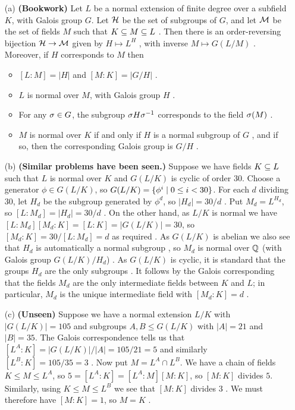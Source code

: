 \documentclass[a4paper]{article}
\begin{document}
\begin{solution}
  \begin{itemize}
  \item[(a)] \textbf{(Bookwork)}
   Let $L$ be a normal extension \mk of finite degree over a
   subfield $K$, with Galois group $G$.  Let $\mathcal{H}$ be the set of
   subgroups of $G$, and let $\mathcal{M}$ be the set of fields $M$ such that
   $K\subseteq M\subseteq L$ \mk.  Then there is an order-reversing \mk bijection
   $\mathcal{H}\to\mathcal{M}$ given by $H\mapsto L^H$ \mk, with inverse
   $M\mapsto G(L/M)$ \mk.  Moreover, if $H$ corresponds to $M$ then
   \begin{itemize}
    \item $[L:M]=|H|$ \mk and $[M:K]=|G/H|$ \mk.
    \item $L$ is normal over $M$, with Galois group $H$ \mk.
    \item For any $\sigma\in G$, the subgroup $\sigma H\sigma^{-1}$ corresponds
     to the field $\sigma(M)$ \mk.
    \item $M$ is normal over $K$ if and only if $H$ is a normal
     subgroup of $G$ \mk, and if so, then the corresponding Galois group
     is $G/H$ \mk.
   \end{itemize}
  \item[(b)] \textbf{(Similar problems have been seen.)}
   Suppose we have fields $K\subseteq L$ such that $L$ is normal
   over $K$ and $G(L/K)$ is cyclic of order $30$.  Choose a generator
   $\phi\in G(L/K)$, so $G(L/K)=\{\phi^i\;|\; 0\leq i<30\}$.  For each
   $d$ dividing $30$, let $H_d$ be the subgroup generated by $\phi^d$,
   so $|H_d|=30/d$ .  Put $M_d=L^{H_d}$, so
   $[L:M_d]=|H_d|=30/d$ \mk.  On the other hand, as $L/K$ is normal we
   have $[L:M_d][M_d:K]=[L:K]=|G(L/K)|=30$, so $[M_d:K]=30/[L:M_d]=d$ as
   required \mk.  As $G(L/K)$ is abelian we also see that $H_d$ is
   automatically a normal subgroup \mk, so $M_d$ is normal over ${\mathbb{Q}}$ (with
   Galois group $G(L/K)/H_d$) \mk.  As $G(L/K)$ is cyclic, it is standard
   that the groups $H_d$ are the only subgroups \mk.  It follows by the
   Galois corresponding that the fields $M_d$ are the only
   intermediate fields between $K$ and $L$; in particular, $M_d$ is
   the unique intermediate field with $[M_d:K]=d$ \mk.
  \item[(c)] \textbf{(Unseen)}
   Suppose we have a normal extension $L/K$ with $|G(L/K)|=105$
   and subgroups $A,B\leq G(L/K)$ with $|A|=21$ and $|B|=35$.  The
   Galois correspondence tells us that $[L^A:K]=|G(L/K)|/|A|=105/21=5$
   and similarly $[L^B:K]=105/35=3$ .  Now put $M=L^A\cap L^B$.  We
   have a chain of fields $K\leq M\leq L^A$, so
   $5=[L^A:K]=[L^A:M][M:K]$, so $[M:K]$ divides $5$.  Similarly, using
   $K\leq M\leq L^B$ we see that $[M:K]$ divides $3$ .  We must
   therefore have $[M:K]=1$, so $M=K$ \mk.
 \end{itemize}
\end{solution}
\end{document}
